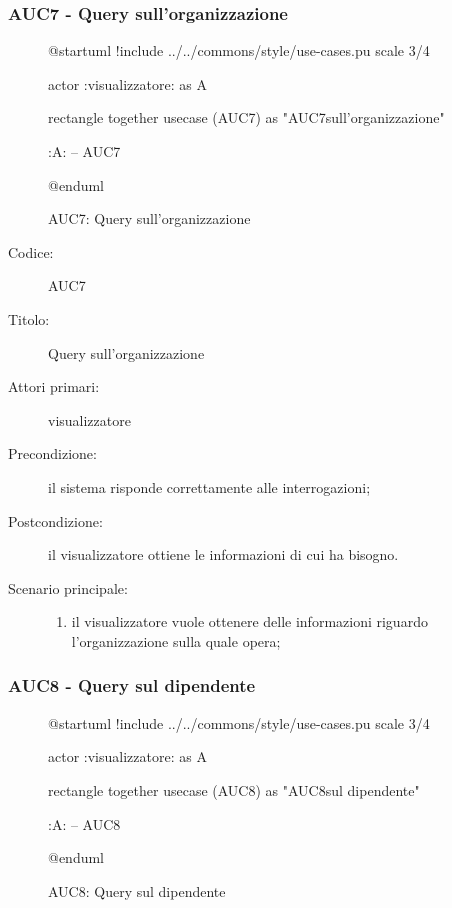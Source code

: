 \documentclass[../analisi-dei-requisiti.tex]{subfiles}
\begin{document}
\subsubsection{AUC7 - Query sull'organizzazione}%
\label{subsub:AUC7}

\begin{figure}[h!]
  \centering
  \begin{plantuml}
  @startuml
  !include ../../commons/style/use-cases.pu
  scale 3/4

  actor :visualizzatore: as A

  rectangle {
    together {
      usecase (AUC7) as "AUC7\nQuery sull'organizzazione"
    }
  }

  :A: -- AUC7

  @enduml
  \end{plantuml}
  \caption{AUC7: Query sull'organizzazione}
  \label{fig:AUC7}
\end{figure}

\begin{description}
  \item[Codice:] AUC7
  \item[Titolo:] Query sull'organizzazione
  \item[Attori primari:] visualizzatore
  \item[Precondizione:] il sistema risponde correttamente alle interrogazioni;
  \item[Postcondizione:] il visualizzatore ottiene le informazioni di cui ha bisogno.
  \item[Scenario principale:]
  \begin{enumerate}
    \item il visualizzatore vuole ottenere delle informazioni riguardo l'organizzazione sulla quale opera;
  \end{enumerate}
\end{description}

\subsubsection{AUC8 - Query sul dipendente}%
\label{subsub:AUC8}

\begin{figure}[h!]
  \centering
  \begin{plantuml}
  @startuml
  !include ../../commons/style/use-cases.pu
  scale 3/4

  actor :visualizzatore: as A

  rectangle {
    together {
      usecase (AUC8) as "AUC8\nQuery sul dipendente"
    }
  }

  :A: -- AUC8

  @enduml
  \end{plantuml}
  \caption{AUC8: Query sul dipendente}
  \label{fig:AUC8}
\end{figure}
\end{document}
